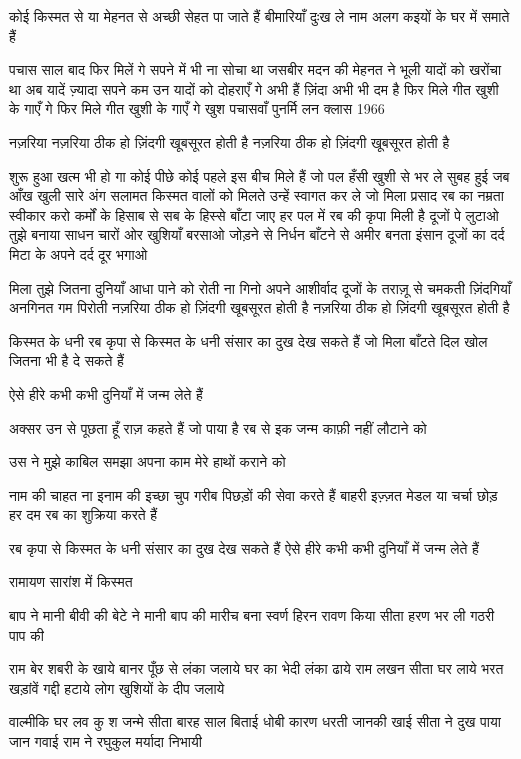 कोई किस्मत से या मेहनत से
अच्छी सेहत पा जाते हैं
बीमारियाँ दुःख ले नाम अलग
कइयों के घर में समाते हैं

पचास साल बाद फिर मिलें गे
सपने में भी ना सोचा था
जसबीर मदन की मेहनत ने
भूली यादों को खरोंचा था
अब यादें ज़्यादा सपने कम
उन यादों को दोहराएँ गे
अभी हैं ज़िंदा अभी भी दम है
फिर मिले गीत खुशी के गाएँ गे
फिर मिले गीत खुशी के गाएँ गे
खुश पचासवाँ पुनर्मि लन
क्लास 1966




नज़रिया
नज़रिया ठीक हो ज़िंदगी खूबसूरत होती है
नज़रिया ठीक हो ज़िंदगी खूबसूरत होती है

शुरू हुआ खत्म भी हो गा कोई पीछे कोई
पहले
इस बीच मिले हैं जो पल हँसी खुशी से
भर ले
सुबह हुई जब आँख खुली सारे अंग सलामत
किस्मत वालों को मिलते उन्हें स्वागत कर ले
जो मिला प्रसाद रब का नम्रता स्वीकार करो
कर्मों के हिसाब से सब के हिस्से बाँटा जाए
हर पल में रब की कृपा मिली है दूजों पे
लुटाओ
तुझे बनाया साधन चारों ओर खुशियाँ
बरसाओ
जोड़ने से निर्धन बाँटने से अमीर बनता इंसान
दूजों का दर्द मिटा के अपने दर्द दूर भगाओ

मिला तुझे जितना दुनियाँ आधा पाने को रोती
ना गिनो अपने आशीर्वाद दूजों के तराज़ू से
चमकती ज़िंदगियाँ अनगिनत गम पिरोती 
नज़रिया ठीक हो ज़िंदगी खूबसूरत होती है
नज़रिया ठीक हो ज़िंदगी खूबसूरत होती है






किस्मत के धनी
रब कृपा से किस्मत के धनी
संसार का दुख देख सकते हैं
जो मिला बाँटते दिल खोल
जितना भी है दे सकते हैं

ऐसे हीरे कभी कभी
दुनियाँ में जन्म लेते हैं

अक्सर उन से पूछता हूँ राज़
कहते हैं जो पाया है रब से
इक जन्म काफ़ी नहीं लौटाने को


उस ने मुझे काबिल समझा
अपना काम मेरे हाथों कराने को

नाम की चाहत ना इनाम की इच्छा
चुप गरीब पिछड़ों की सेवा करते हैं
बाहरी इज़्ज़त मेडल या चर्चा छोड़
हर दम रब का शुक्रिया करते हैं

रब कृपा से किस्मत के धनी
संसार का दुख देख सकते हैं
ऐसे हीरे कभी कभी
दुनियाँ में जन्म लेते हैं



रामायण सारांश में किस्मत

बाप ने मानी बीवी की
बेटे ने मानी बाप की
मारीच बना स्वर्ण हिरन
रावण किया सीता हरण
भर ली गठरी पाप की
 
राम बेर शबरी के खाये
बानर पूँछ से लंका जलाये
घर का भेदी लंका ढाये
राम लखन सीता घर लाये
भरत खड़ांवें गद्दी हटाये
लोग खुशियों के दीप जलाये

वाल्मीकि घर लव कु श जन्मे
सीता बारह साल बिताई
धोबी कारण धरती जानकी खाई
सीता ने दुख पाया जान गवाई
राम ने रघुकुल मर्यादा निभायी


